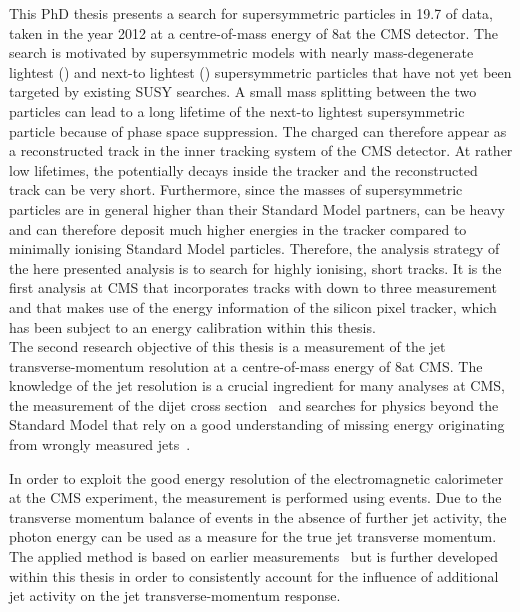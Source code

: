 This PhD thesis presents a search for supersymmetric particles in 19.7 \fbinv of data, taken in the year 2012 at a centre-of-mass energy of 8\tev at the CMS detector. 
The search is motivated by supersymmetric models with nearly mass-degenerate lightest (\chiO) and next-to lightest (\chipm) supersymmetric particles that have not yet been targeted by existing SUSY searches.
A small mass splitting between the two particles can lead to a long lifetime of the next-to lightest supersymmetric particle \chipm because of phase space suppression.
The charged \chipm can therefore appear as a reconstructed track in the inner tracking system of the CMS detector.
At rather low \chipm lifetimes, the \chipm potentially decays inside the tracker and the reconstructed track can be very short.  
Furthermore, since the masses of supersymmetric particles are in general higher than their Standard Model partners, \chipm can be heavy and can therefore deposit much higher energies in the tracker compared to minimally ionising Standard Model particles.
Therefore, the analysis strategy of the here presented analysis is to search for highly ionising, short tracks.
It is the first analysis at CMS that incorporates tracks with down to three measurement and that makes use of the energy information of the silicon pixel tracker, which has been subject to an energy calibration within this thesis.\\

The second research objective of this thesis is a measurement of the jet transverse-momentum resolution at a centre-of-mass energy of 8\tev at CMS.
The knowledge of the jet \pt resolution is a crucial ingredient for many analyses at CMS, \eg the measurement of the dijet cross section~\cite{bib:CMS:QCD_measurements} and searches for physics beyond the Standard Model that rely on a good understanding of missing energy originating from wrongly measured jets~\cite{bib:CMS:RA2_8TeV}.

In order to exploit the good energy resolution of the electromagnetic calorimeter at the CMS experiment, the measurement is performed using \GAMJET events.
Due to the transverse momentum balance of \GAMJET events in the absence of further jet activity, the photon energy can be used as a measure for the true jet transverse momentum.
The applied method is based on earlier measurements~\cite{bib:CMS:JERCPaper_2011,CMS:PAS:JETResolution_7TeV} but is further developed within this thesis in order to consistently account for the influence of additional jet activity on the jet transverse-momentum response.\\

